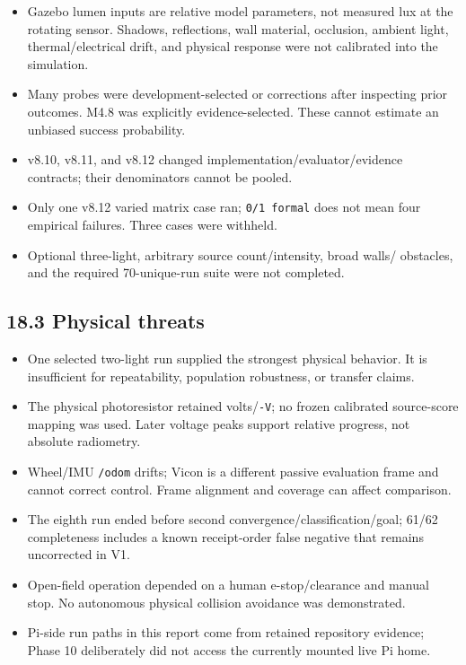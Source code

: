 \documentclass[
  10pt,
  letterpaper,
]{article}
\providecommand{\tightlist}{%
  \setlength{\itemsep}{0pt}\setlength{\parskip}{0pt}}
\begin{document}
\begin{itemize}
\tightlist
\item
  Gazebo lumen inputs are relative model parameters, not measured lux at the
  rotating sensor. Shadows, reflections, wall material, occlusion, ambient
  light, thermal/electrical drift, and physical response were not calibrated
  into the simulation.
\item
  Many probes were development-selected or corrections after inspecting prior
  outcomes. M4.8 was explicitly evidence-selected. These cannot estimate an
  unbiased success probability.
\item
  v8.10, v8.11, and v8.12 changed implementation/evaluator/evidence contracts;
  their denominators cannot be pooled.
\item
  Only one v8.12 varied matrix case ran; \texttt{0/1 formal} does not mean four
  empirical failures. Three cases were withheld.
\item
  Optional three-light, arbitrary source count/intensity, broad walls/
  obstacles, and the required 70-unique-run suite were not completed.
\end{itemize}

\subsection{18.3 Physical threats}\label{physical-threats}

\begin{itemize}
\tightlist
\item
  One selected two-light run supplied the strongest physical behavior. It is
  insufficient for repeatability, population robustness, or transfer claims.
\item
  The physical photoresistor retained volts/\nolinkurl{-V}; no frozen calibrated
  source-score mapping was used. Later voltage peaks support relative progress,
  not absolute radiometry.
\item
  Wheel/IMU \nolinkurl{/odom} drifts; Vicon is a different passive evaluation frame and
  cannot correct control. Frame alignment and coverage can affect comparison.
\item
  The eighth run ended before second convergence/classification/goal; 61/62
  completeness includes a known receipt-order false negative that remains
  uncorrected in V1.
\item
  Open-field operation depended on a human e-stop/clearance and manual stop.
  No autonomous physical collision avoidance was demonstrated.
\item
  Pi-side run paths in this report come from retained repository evidence;
  Phase 10 deliberately did not access the currently mounted live Pi home.
\end{itemize}
\end{document}
